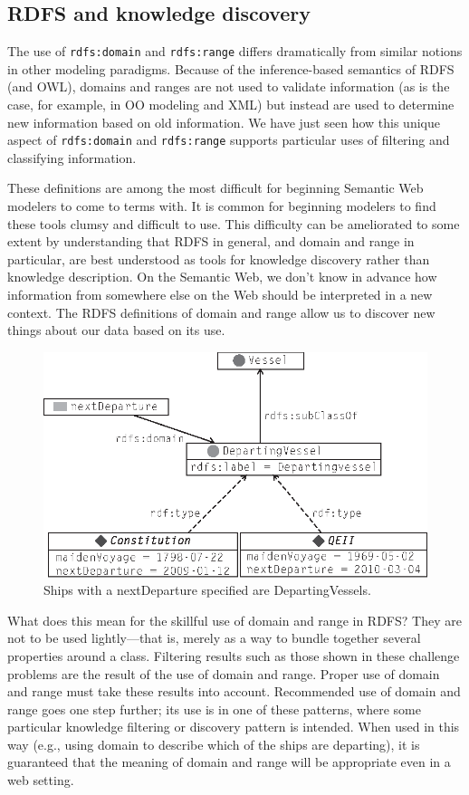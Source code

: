 \subsection{RDFS and knowledge discovery}

The use of \texttt{rdfs:domain} and \texttt{rdfs:range} differs dramatically from similar
notions in other modeling paradigms. Because of the inference-based
semantics of RDFS (and OWL), domains and ranges are not used to validate
information (as is the case, for example, in OO modeling and XML) but
instead are used to determine new information based on old information.
We have just seen how this unique aspect of \texttt{rdfs:domain} and \texttt{rdfs:range}
supports particular uses of filtering and classifying information.

These definitions are among the most difficult for beginning Semantic
Web modelers to come to terms with. It is common for beginning modelers
to find these tools clumsy and difficult to use. This difficulty can be
ameliorated to some extent by understanding that RDFS in general, and
domain and range in particular, are best understood as tools for
knowledge discovery rather than knowledge description. On the Semantic
Web, we don't know in advance how information from somewhere else
on the Web should be interpreted in a new context. The RDFS definitions
of domain and range
allow us to discover new things about our data based on its use.


\begin{figure}
\centering
\includegraphics[width=5in]{media/ch8/f08-5.eps}
\caption{Ships with a nextDeparture specified are DepartingVessels.}
\label{fig:ch8.5}
\end{figure}





What does this mean for the skillful use of domain and range in RDFS?
They are not to be used lightly---that is, merely as a way to bundle
together several properties around a class. Filtering results such as
those shown in these challenge problems are the result of the use of
domain and range. Proper use of domain and range must take these results
into account. Recommended use of domain and range goes one step further;
its use is in one of these patterns, where some particular knowledge
filtering or discovery pattern is intended. When used in this way (e.g.,
using domain to describe which of the ships are departing), it is
guaranteed that the meaning of domain and range will be appropriate even
in a web setting.

